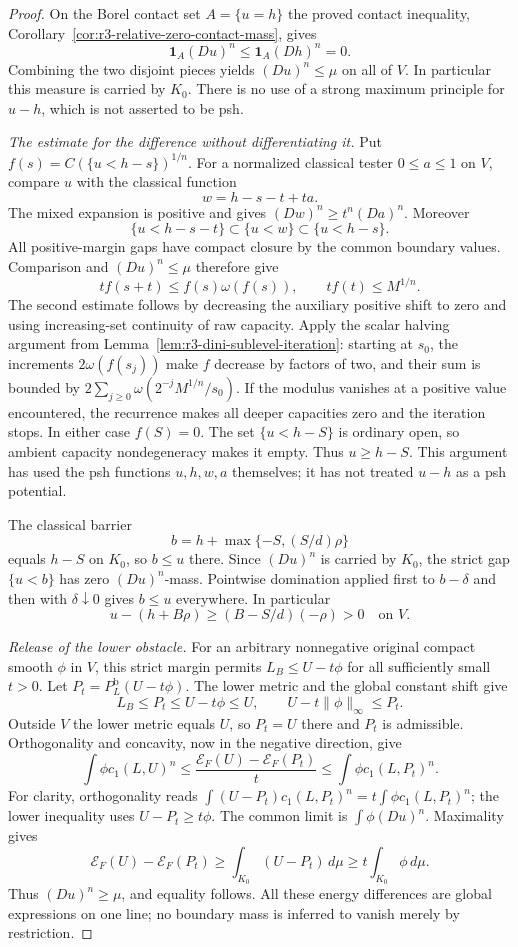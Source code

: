 \documentclass[11pt,a4paper]{article}
\numberwithin{equation}{section}
\theoremstyle{definition}
\theoremstyle{remark}
\begin{document}
\begin{proof}
On the Borel contact set $A=\{u=h\}$ the proved contact
inequality, Corollary~\ref{cor:r3-relative-zero-contact-mass},
gives
\[
 \mathbf1_A(Du)^n\leq\mathbf1_A(Dh)^n=0.
\]
Combining the two disjoint pieces yields $(Du)^n\leq\mu$
on all of $V$. In particular this measure is carried by $K_0$.
There is no use of a strong maximum principle for $u-h$, which
is not asserted to be psh.

\emph{The estimate for the difference without differentiating it.}
Put $f(s)=C(\{u<h-s\})^{1/n}$. For a normalized classical
tester $0\leq a\leq1$ on $V$, compare $u$ with the classical
function
\[
 w=h-s-t+ta.
\]
The mixed expansion is positive and gives
$(Dw)^n\geq t^n(Da)^n$. Moreover
\[
 \{u<h-s-t\}\subset\{u<w\}\subset\{u<h-s\}.
\]
All positive-margin gaps have compact closure by the common
boundary values. Comparison and $(Du)^n\leq\mu$ therefore
give
\[
 t f(s+t)\leq f(s)\omega(f(s)),\qquad
 t f(t)\leq M^{1/n}.
\]
The second estimate follows by decreasing the auxiliary positive
shift to zero and using increasing-set continuity of raw capacity.
Apply the scalar halving argument from
Lemma~\ref{lem:r3-dini-sublevel-iteration}: starting at $s_0$,
the increments $2\omega(f(s_j))$ make $f$ decrease by factors
of two, and their sum is bounded by
$2\sum_{j\geq0}\omega(2^{-j}M^{1/n}/s_0)$. If the modulus
vanishes at a positive value encountered, the recurrence makes
all deeper capacities zero and the iteration stops. In either
case $f(S)=0$. The set $\{u<h-S\}$ is ordinary open, so
ambient capacity nondegeneracy makes it empty. Thus $u\geq h-S$.
This argument has used the psh functions $u,h,w,a$ themselves;
it has not treated $u-h$ as a psh potential.

The classical barrier
\[
 b=h+\max\{-S,(S/d)\rho\}
\]
equals $h-S$ on $K_0$, so $b\leq u$ there. Since $(Du)^n$
is carried by $K_0$, the strict gap $\{u<b\}$ has zero
$(Du)^n$-mass. Pointwise domination applied first to $b-\delta$
and then with $\delta\downarrow0$ gives $b\leq u$ everywhere.
In particular
\[
 u-(h+B\rho)\geq(B-S/d)(-\rho)>0\quad\text{on }V.
\]

\emph{Release of the lower obstacle.}
For an arbitrary nonnegative original compact smooth $\phi$ in
$V$, this strict margin permits $L_B\leq U-t\phi$ for all
sufficiently small $t>0$. Let $P_t=P_L^{\mathrm b}(U-t\phi)$.
The lower metric and the global constant shift give
\[
 L_B\leq P_t\leq U-t\phi\leq U,
 \qquad U-t\|\phi\|_\infty\leq P_t.
\]
Outside $V$ the lower metric equals $U$, so $P_t=U$ there and
$P_t$ is admissible. Orthogonality and concavity, now in the
negative direction, give
\[
 \int\phi c_1(L,U)^n
 \leq\frac{\mathcal E_F(U)-\mathcal E_F(P_t)}t
 \leq\int\phi c_1(L,P_t)^n.
\]
For clarity, orthogonality reads
$\int(U-P_t)c_1(L,P_t)^n=t\int\phi c_1(L,P_t)^n$;
the lower inequality uses $U-P_t\geq t\phi$.
The common limit is $\int\phi(Du)^n$. Maximality gives
\[
 \mathcal E_F(U)-\mathcal E_F(P_t)
       \geq\int_{K_0}(U-P_t)\,d\mu
       \geq t\int_{K_0}\phi\,d\mu.
\]
Thus $(Du)^n\geq\mu$, and equality follows. All these energy
differences are global expressions on one line; no boundary mass
is inferred to vanish merely by restriction.


\end{proof}
\end{document}
